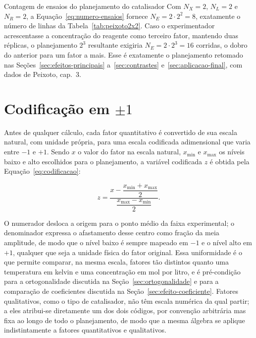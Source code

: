\documentclass{doeapostila}
\begin{document}
\begin{aplicacao}{Contagem de ensaios do planejamento do catalisador}
  Com $N_X = 2$, $N_L = 2$ e $N_R = 2$, a Equação~\eqref{eq:numero-ensaios}
  fornece $N_E = 2 \cdot 2^{2} = 8$, exatamente o número de linhas da
  Tabela~\ref{tab:peixoto2x2}. Caso o experimentador acrescentasse a
  concentração do reagente como terceiro fator, mantendo duas réplicas, o
  planejamento $2^{3}$ resultante exigiria $N_E = 2 \cdot 2^{3} = 16$
  corridas, o dobro do anterior para um fator a mais. Esse é exatamente o
  planejamento retomado nas Seções~\ref{sec:efeitos-principais}
  a~\ref{sec:contrastes} e~\ref{sec:aplicacao-final}, com dados de
  Peixoto, cap.~3.
\end{aplicacao}

\section{Codificação em $\pm 1$}
\label{sec:codificacao}

Antes de qualquer cálculo, cada fator quantitativo é convertido de sua
escala natural, com unidade própria, para uma escala codificada adimensional
que varia entre $-1$ e $+1$. Sendo $x$ o valor do fator na escala natural,
$x_{\min}$ e $x_{\max}$ os níveis baixo e alto escolhidos para o
planejamento, a variável codificada $z$ é obtida pela
Equação~\eqref{eq:codificacao}:

\begin{equation}
  z = \frac{x - \dfrac{x_{\min} + x_{\max}}{2}}{\dfrac{x_{\max} - x_{\min}}{2}} .
  \label{eq:codificacao}
\end{equation}

O numerador desloca a origem para o ponto médio da faixa experimental; o
denominador expressa o afastamento desse centro como fração da meia
amplitude, de modo que o nível baixo é sempre mapeado em $-1$ e o nível alto
em $+1$, qualquer que seja a unidade física do fator original. Essa
uniformidade é o que permite comparar, na mesma escala, fatores tão distintos
quanto uma temperatura em kelvin e uma concentração em mol por litro, e é
pré-condição para a ortogonalidade discutida na Seção~\ref{sec:ortogonalidade}
e para a comparação de coeficientes discutida na
Seção~\ref{sec:efeito-coeficiente}. Fatores qualitativos, como o tipo de
catalisador, não têm escala numérica da qual partir; a eles atribui-se
diretamente um dos dois códigos, por convenção arbitrária mas fixa ao longo
de todo o planejamento, de modo que a mesma álgebra se aplique indistintamente
a fatores quantitativos e qualitativos.
\end{document}
